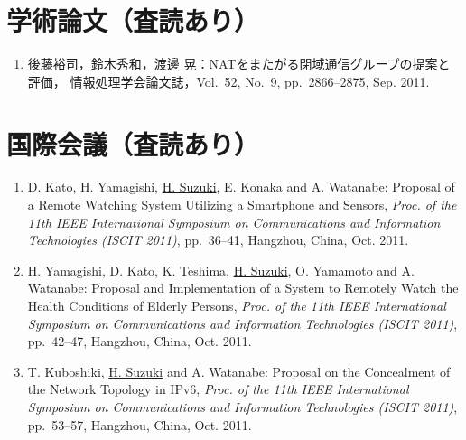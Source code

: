 
\section*{学術論文（査読あり）}
\begin{enumerate}
\item 後藤裕司，\underline{鈴木秀和}，渡邊 晃：NATをまたがる閉域通信グループの提案と評価，
情報処理学会論文誌，Vol.~52, No.~9, pp.\ 2866--2875, Sep. 2011.
\end{enumerate}

\section*{国際会議（査読あり）}
\begin{enumerate}
\item D. Kato, H. Yamagishi, \underline{H. Suzuki}, E. Konaka and A. Watanabe: 
Proposal of a Remote Watching System Utilizing a Smartphone and Sensors,
{\em Proc. of the 11th IEEE International Symposium on Communications and Information Technologies (ISCIT 2011)},
pp.\ 36--41, Hangzhou, China, Oct. 2011.

\item H. Yamagishi, D. Kato, K. Teshima, \underline{H. Suzuki}, O. Yamamoto and A. Watanabe: 
Proposal and Implementation of a System to Remotely Watch the Health Conditions of Elderly Persons,
{\em Proc. of the 11th IEEE International Symposium on Communications and Information Technologies (ISCIT 2011)},
pp.\ 42--47, Hangzhou, China, Oct. 2011.

\item T. Kuboshiki, \underline{H. Suzuki} and A. Watanabe: 
Proposal on the Concealment of the Network Topology in IPv6,
{\em Proc. of the 11th IEEE International Symposium on Communications and Information Technologies (ISCIT 2011)},
pp.\ 53--57, Hangzhou, China, Oct. 2011.
\end{enumerate}

